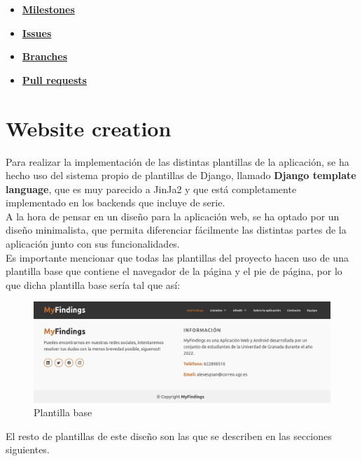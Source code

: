\begin{itemize}
    \item \textbf{\href{https://github.com/alexespana/TFG/milestones}{Milestones}}
    \item \textbf{\href{https://github.com/alexespana/TFG/issues}{Issues}}
    \item \textbf{\href{https://github.com/alexespana/TFG/branches}{Branches}}
    \item \textbf{\href{https://github.com/alexespana/TFG/pulls}{Pull requests}}
\end{itemize}


\section{Website creation}
Para realizar la implementación de las distintas plantillas de la aplicación, se ha hecho
uso del sistema propio de plantillas de Django, llamado \textbf{Django template language},
que es muy parecido a JinJa2 y que está completamente implementado en los backends que
incluye de serie.\\

A la hora de pensar en un diseño para la aplicación web, se ha optado por un diseño
minimalista, que permita diferenciar fácilmente las distintas partes de la aplicación
junto con sus funcionalidades.\\

Es importante mencionar que todas las plantillas del proyecto hacen uso de una plantilla
base que contiene el navegador de la página y el pie de página, por lo que dicha plantilla base
sería tal que así:\\

    \begin{figure}[H]
        \centering
        \includegraphics[scale=0.25]{imagenes/base.png}
        \caption{Plantilla base}
        \label{fig:base}
    \end{figure}

El resto de plantillas de este diseño son las que se describen en las secciones siguientes.

